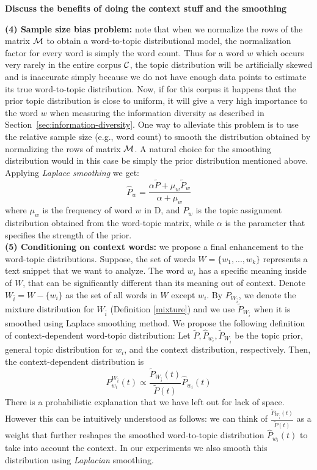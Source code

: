 \documentclass{article}
\begin{document}
{\bf Discuss the benefits of doing the context stuff and the smoothing}

{\bf (4) Sample size bias problem:}  note that 
when we normalize the rows of the matrix ${\mathcal M}$ to obtain a word-to-topic distributional model, the normalization factor 
for every word is simply the word count. Thus for a word $w$ which occurs very rarely
in the entire corpus ${\mathcal C}$, the topic distribution will be artificially skewed and is inaccurate simply because we do not have enough data points to estimate its true word-to-topic distribution.
Now, if for this corpus it happens that the prior topic distribution
is close to uniform, it will give a very high importance to the word
$w$ when measuring the information diversity as described in
Section~\ref{sec:information-diversity}.
One way to alleviate this
problem is to use the relative sample size (e.g., word count) to
smooth the distribution obtained by normalizing the rows of matrix
${\mathcal M}$. A natural choice for the smoothing distribution would in this
case be simply the prior distribution mentioned above. Applying {\em Laplace smoothing}
we get:
\begin{equation}
\widehat{P}_w=\frac{\alpha \tilde{P}+ \mu_w \tilde{P}_w}{\alpha+\mu_w}
\end{equation}
where $\mu_w$ is the frequency of word $w$ in D, and $P_w$ is the
topic assignment distribution obtained from the word-topic matrix,
while $\alpha$ is the parameter that specifies the strength of the
prior.\\
{\bf (5) Conditioning on context words:} we propose a final enhancement to the word-topic
distributions. Suppose, the set of words $W=\{w_1,...,w_k\}$
represents a text snippet that we want to analyze. The word $w_i$ has
a specific meaning inside of $W$, that can be significantly different
than its meaning out of context. Denote
$W_{\bar{i}}=W-\{w_i\}$ as the set of all words in $W$ except
$w_i$. By $P_{W_{\bar{i}}}$, we denote the mixture distribution for $W_{\bar{i}}$ (Definition \ref{mixture}) and we use $\tilde{P}_{W_{\bar{i}}}$ when it is smoothed using Laplace smoothing method. We
propose the following definition of context-dependent word-topic
distribution:
\bed
Let $\tilde{P},\widehat{P}_{w_i}, \tilde{P}_{W_{\bar{i}}}$ be the topic prior, general
topic distribution for $w_i$, and the context distribution,
respectively. Then, the context-dependent distribution is
\begin{equation*}
P^{W_{\bar{i}}}_{w_i}(t)\propto \frac{\tilde{P}_{W_{\bar{i}}}(t)}{\tilde{P}(t)}\widehat{P}_{w_i}(t)
\end{equation*}
\eed
There is a probabilistic explanation that we have left out for 
lack of space. However this can be intuitively understood as follows:
we can think of $\frac{\tilde{P}_{W_{\bar{i}}}(t)}{\tilde{P}(t)}$ as a weight
that further reshapes the smoothed word-to-topic distribution $\widehat{P}_{w_i}(t)$
to take into account the context. In our experiments we also smooth this distribution
using {\em Laplacian} smoothing.
\end{document}
